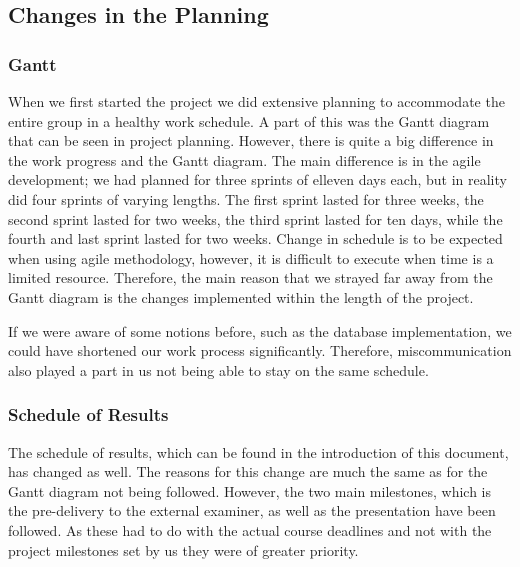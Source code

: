 \documentclass[../document.tex]{subfiles}
\begin{document}
\subsection{Changes in the Planning}

\subsubsection{Gantt}
When we first started the project we did extensive planning to accommodate the entire group in a healthy work schedule. A part of this was the Gantt diagram that can be seen in project planning. However, there is quite a big difference in the work progress and the Gantt diagram. The main difference is in the agile development; we had planned for three sprints of elleven days each, but in reality did four sprints of varying lengths. The first sprint lasted for three weeks, the second sprint lasted for two weeks, the third sprint lasted for ten days, while the fourth and last sprint lasted for two weeks. Change in schedule is to be expected when using agile methodology, however, it is difficult to execute when time is a limited resource. Therefore, the main reason that we strayed far away from the Gantt diagram is the changes implemented within the length of the project. 

If we were aware of some notions before, such as the database implementation, we could have shortened our work process significantly. Therefore, miscommunication also played a part in us not being able to stay on the same schedule.

\subsubsection{Schedule of Results}
The schedule of results, which can be found in the introduction of this document, has changed as well. The reasons for this change are much the same as for the Gantt diagram not being followed. However, the two main milestones, which is the pre-delivery to the external examiner, as well as the presentation have been followed. As these had to do with the actual course deadlines and not with the project milestones set by us they were of greater priority.
\end{document}
